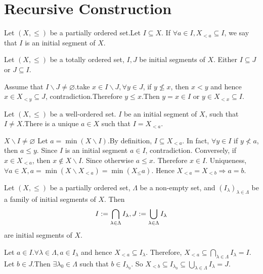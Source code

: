 \documentclass{book}
\numberwithin{equation}{section}
\begin{document}
\section{Recursive Construction}
\begin{definitionenv}
    Let $(X, \le)$ be a partially ordered set.Let $I\subseteq X$. If $\forall a\in I , X_{<a}\subseteq I$,  we say that $I$ is an initial segment of $X$. 
\end{definitionenv}
\begin{propositionenv}
    Let $(X, \le)$ be a totally ordered set,  $I, J$ be initial segments of $X$. Either $I\subseteq J$ or $J\subseteq I$.
\end{propositionenv}
\begin{proofenv}
    Assume that $I\backslash J\not=\varnothing$.take $x\in I\backslash J, \forall y\in J$,  if $y\not\le x $, then $x<y$ and hence $x\in X_{<y}\subseteq J$, contradiction.Therefore $y\le x$.Then $y=x\in I$ or $y\in X_{<x}\subseteq I$.
\end{proofenv}
\begin{propositionenv}
    Let $(X, \le)$ be a well-ordered set. $I$ be an initial segment of $X$,  such that $I\not=X$.There is a unique $a\in X$ such that $I=X_{<a}$.
\end{propositionenv}
\begin{proofenv}
    $X\backslash I\not=\varnothing$ Let $a=\min (X\backslash I)$.By definition, $I\subseteq X_{<a}$. In fact,  $\forall y\in I$ if $y\not< a $,  then $a\le y$.
    Since $I$ is an initial segment $a\in I$,  contradiction.
    \newline
    Conversely,  if $x\in X_{<a}$,  then $x\notin X\backslash I$. Since otherwise $a\le x$. Therefore $x\in I$. Uniqueness, $\forall a\in X, a=\min(X\backslash X_{<a})=\min(X_\leq a)$. Hence $X_{<a}=X_{<b}\Rightarrow a=b$.
\end{proofenv}
\begin{propositionenv}
    Let $(X, \le)$ be a partially ordered set,  $\Lambda$ be a non-empty set,  and $(I_\lambda)_{\lambda\in \Lambda}$ be a family of initial segments of $X$. Then 
    $$I:=\bigcap_{\lambda\in \Lambda}I_\lambda, \space J:=\bigcup_{\lambda\in \Lambda}I_\lambda$$ are initial segments of $X$.
\end{propositionenv}
\begin{proofenv}
    \quad
    \newline
    Let $a\in I.\forall \lambda\in \Lambda, a\in I_\lambda$ and hence $X_{<a}\subseteq I_\lambda$. Therefore, $X_{<a}\subseteq\bigcap_{\lambda\in\Lambda}I_\lambda=I$.
    \newline
    Let $b\in J$.Then $\exists \lambda_0\in \Lambda$ such that $b\in I_{\lambda_0}$. So $X_{<b}\subseteq I_{\lambda_0}\subseteq \bigcup_{\lambda\in \Lambda}I_\lambda=J$. 
\end{proofenv}
\end{document}
